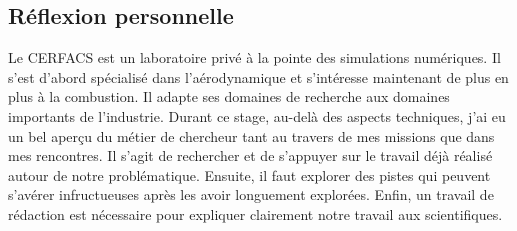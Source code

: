 \subsection*{Réflexion personnelle}

Le CERFACS est un laboratoire privé à la pointe des simulations numériques. Il s'est d'abord spécialisé dans l'aérodynamique et s’intéresse maintenant de plus en plus à la combustion. Il adapte ses domaines de recherche aux domaines importants de l'industrie.
Durant ce stage, au-delà des aspects techniques, j'ai eu un bel aperçu du métier de chercheur tant au travers de mes missions que dans mes rencontres. Il s'agit de rechercher et de s'appuyer sur le travail déjà réalisé autour de notre problématique.
Ensuite, il faut explorer des pistes qui peuvent s'avérer infructueuses après les avoir longuement explorées.
Enfin, un travail de rédaction est nécessaire pour expliquer clairement notre travail aux scientifiques.
